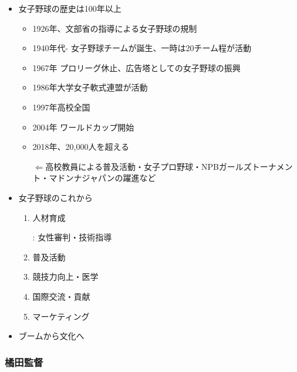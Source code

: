 \documentclass[dvipdfmx, 10.5pt]{jsarticle}
\begin{document}
\begin{itemize}
  \item 女子野球の歴史は100年以上

  \begin{itemize}
    \item 1926年、文部省の指導による女子野球の規制

    \item 1940年代- 女子野球チームが誕生、一時は20チーム程が活動

    \item 1967年 プロリーグ休止、広告塔としての女子野球の振興

    \item 1986年大学女子軟式連盟が活動

    \item 1997年高校全国

    \item 2004年 ワールドカップ開始

    \item 2018年、20,000人を超える

    $\Leftarrow$高校教員による普及活動・女子プロ野球・NPBガールズトーナメント・マドンナジャパンの躍進など
  \end{itemize}

  \item 女子野球のこれから

  \begin{enumerate}
    \item 人材育成

    : 女性審判・技術指導

    \item 普及活動

    \item 競技力向上・医学

    \item 国際交流・貢献

    \item マーケティング

  \end{enumerate}

  \item ブームから文化へ

\end{itemize}

\subsubsection{橘田監督}
\end{document}
